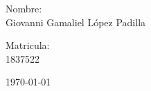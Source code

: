 \begin{titlepage}
\begin{center}
\begin{minipage}{0.6\linewidth}
\changefontsizes{14pt}
Nombre:\\
Giovanni Gamaliel López Padilla\\
\end{minipage}
\begin{minipage}{0.2\linewidth}
\changefontsizes{14pt}
Matricula:\\
1837522\\
\end{minipage}
\end{center}
\vspace{4cm}
\begin{flushright}
\today
\end{flushright}
\pagebreak
\end{titlepage}